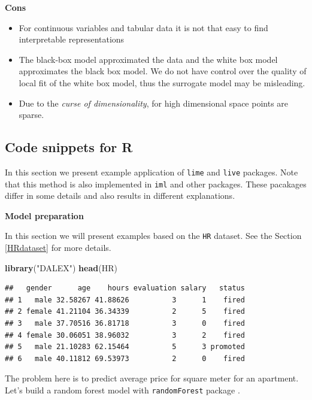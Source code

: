 \documentclass[12pt,]{krantz}
\newenvironment{Shaded}{\begin{snugshade}}{\end{snugshade}}
\newcommand{\KeywordTok}[1]{\textcolor[rgb]{0.13,0.29,0.53}{\textbf{#1}}}
\newcommand{\NormalTok}[1]{#1}
\newcommand{\StringTok}[1]{\textcolor[rgb]{0.31,0.60,0.02}{#1}}
\providecommand{\tightlist}{%
  \setlength{\itemsep}{0pt}\setlength{\parskip}{0pt}}
\theoremstyle{definition}
\theoremstyle{definition}
\theoremstyle{definition}
\theoremstyle{remark}
\begin{document}
\textbf{Cons}

\begin{itemize}
\tightlist
\item
  For continuous variables and tabular data it is not that easy to find
  interpretable representations
\item
  The black-box model approximated the data and the white box model
  approximates the black box model. We do not have control over the
  quality of local fit of the white box model, thus the surrogate model
  may be misleading.
\item
  Due to the \emph{curse of dimensionality}, for high dimensional space
  points are sparse.
\end{itemize}

\hypertarget{code-snippets-for-r-7}{%
\subsection{Code snippets for R}\label{code-snippets-for-r-7}}

In this section we present example application of \texttt{lime}
\citep{R-lime} and \texttt{live} \citep{R-live} packages. Note that this
method is also implemented in \texttt{iml} \citep{R-iml} and other
packages. These pacakages differ in some details and also results in
different explanations.

\textbf{Model preparation}

In this section we will present examples based on the \texttt{HR}
dataset. See the Section \ref{HRdataset} for more details.

\begin{Shaded}
\begin{Highlighting}[]
\KeywordTok{library}\NormalTok{(}\StringTok{"DALEX"}\NormalTok{)}
\KeywordTok{head}\NormalTok{(HR)}
\end{Highlighting}
\end{Shaded}

\begin{verbatim}
##   gender      age    hours evaluation salary   status
## 1   male 32.58267 41.88626          3      1    fired
## 2 female 41.21104 36.34339          2      5    fired
## 3   male 37.70516 36.81718          3      0    fired
## 4 female 30.06051 38.96032          3      2    fired
## 5   male 21.10283 62.15464          5      3 promoted
## 6   male 40.11812 69.53973          2      0    fired
\end{verbatim}

The problem here is to predict average price for square meter for an
apartment. Let's build a random forest model with \texttt{randomForest}
package \citep{R-randomForest}.
\end{document}

